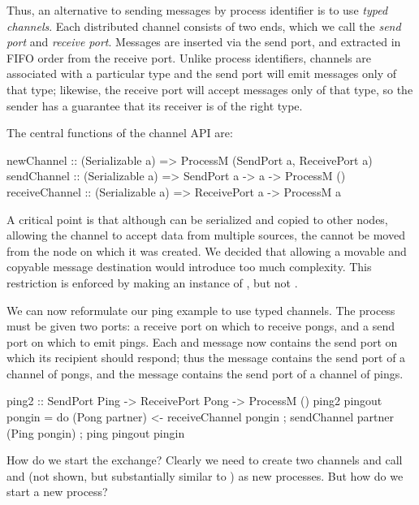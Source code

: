 \documentclass[preprint]{sigplanconf}
\begin{document}
Thus, an alternative to sending messages by process identifier is to use {\em typed channels}. Each distributed channel consists of two ends, which we call the {\em send port} and {\em receive port}. Messages are inserted via the send port, and extracted in FIFO order from the receive port. Unlike process identifiers, channels are associated with a particular type and the send port will emit messages only of that type; likewise, the receive port will accept messages only of that type, so the sender has a guarantee that its receiver is of the right type.

The central functions of the channel API are:

\begin{code}
newChannel :: (Serializable a) => ProcessM (SendPort a, ReceivePort a)
sendChannel :: (Serializable a) => SendPort a -> a -> ProcessM ()
receiveChannel :: (Serializable a) => ReceivePort a -> ProcessM a
\end{code}

A critical point is that although  can be serialized and copied to other nodes, allowing the channel to accept data from multiple sources, the  cannot be moved from the node on which it was created. We decided that allowing a movable and copyable message destination would introduce too much complexity. This restriction is enforced by making  an instance of , but not . 

We can now reformulate our ping example to use typed channels. The process must be given two ports: a receive port on which to receive pongs, and a send port on which to emit pings. Each  and  message now contains the send port on which its recipient should respond; thus the  message contains the send port of a channel of pongs, and the  message contains the send port of a channel of pings.

\begin{code}
ping2 :: SendPort Ping -> ReceivePort Pong -> ProcessM ()
ping2 pingout pongin = 
   do { (Pong partner) <- receiveChannel pongin
      ; sendChannel partner (Ping pongin) 
      ; ping pingout pingin }
\end{code}

How do we start the exchange? Clearly we need to create two channels and call  and  (not shown, but substantially similar to ) as new processes. But how do we start a new process?
\end{document}
